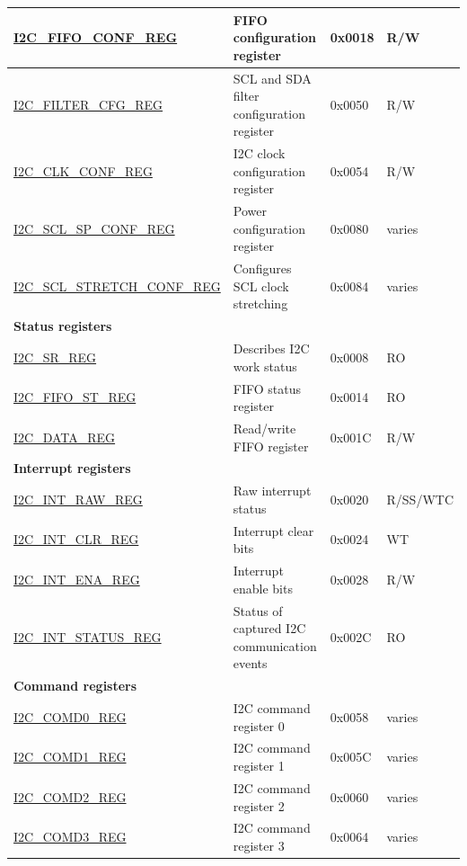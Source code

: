 \begin{longtable}{  | m{5.7cm} | m{7cm} | m{1.3cm} | m{1.5cm} | }
\hyperref[regdesc:I2CFIFOCONFREG]{I2C\_FIFO\_CONF\_REG} & FIFO configuration register & 0x0018 & R/W \\ \hline
\hyperref[regdesc:I2CFILTERCFGREG]{I2C\_FILTER\_CFG\_REG} & SCL and SDA filter configuration register & 0x0050 & R/W \\ \hline
\hyperref[regdesc:I2CCLKCONFREG]{I2C\_CLK\_CONF\_REG} & I2C clock configuration register & 0x0054 & R/W \\ \hline
\hyperref[regdesc:I2CSCLSPCONFREG]{I2C\_SCL\_SP\_CONF\_REG} & Power configuration register & 0x0080 & varies \\ \hline
\hyperref[regdesc:I2CSCLSTRETCHCONFREG]{I2C\_SCL\_STRETCH\_CONF\_REG} & Configures SCL clock stretching & 0x0084 & varies \\ \hline
\multicolumn{4}{|l|}{\textbf{Status registers}} \\ \hline
\hyperref[regdesc:I2CSRREG]{I2C\_SR\_REG} & Describes I2C work status & 0x0008 & RO \\ \hline
\hyperref[regdesc:I2CFIFOSTREG]{I2C\_FIFO\_ST\_REG} & FIFO status register & 0x0014 & RO \\ \hline
\hyperref[regdesc:I2CDATAREG]{I2C\_DATA\_REG} & Read/write FIFO register & 0x001C & R/W \\ \hline
\multicolumn{4}{|l|}{\textbf{Interrupt registers}} \\ \hline
\hyperref[regdesc:I2CINTRAWREG]{I2C\_INT\_RAW\_REG} & Raw interrupt status & 0x0020 & R/SS/WTC \\ \hline
\hyperref[regdesc:I2CINTCLRREG]{I2C\_INT\_CLR\_REG} & Interrupt clear bits & 0x0024 & WT \\ \hline
\hyperref[regdesc:I2CINTENAREG]{I2C\_INT\_ENA\_REG} & Interrupt enable bits & 0x0028 & R/W \\ \hline
\hyperref[regdesc:I2CINTSTATUSREG]{I2C\_INT\_STATUS\_REG} & Status of captured I2C communication events & 0x002C & RO \\ \hline
\multicolumn{4}{|l|}{\textbf{Command registers}} \\ \hline
\hyperref[regdesc:I2CCOMD0REG]{I2C\_COMD0\_REG} & I2C command register 0 & 0x0058 & varies \\ \hline
\hyperref[regdesc:I2CCOMD1REG]{I2C\_COMD1\_REG} & I2C command register 1 & 0x005C & varies \\ \hline
\hyperref[regdesc:I2CCOMD2REG]{I2C\_COMD2\_REG} & I2C command register 2 & 0x0060 & varies \\ \hline
\hyperref[regdesc:I2CCOMD3REG]{I2C\_COMD3\_REG} & I2C command register 3 & 0x0064 & varies \\ \hline

\end{longtable}

